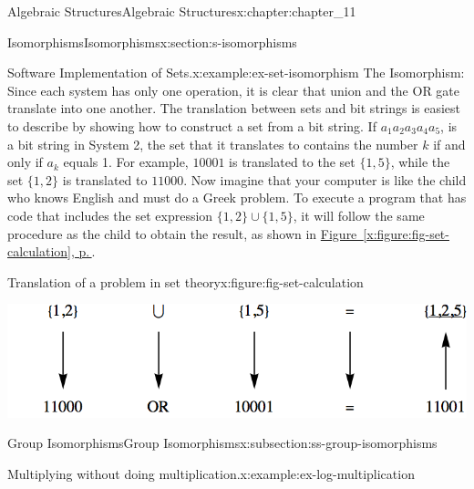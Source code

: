 \documentclass[twoside,10pt,]{book}
\newcommand{\xreffont}{\relax}
\numberwithin{equation}{section}
\begin{document}
\begin{chapterptx}{Algebraic Structures}{}{Algebraic Structures}{}{}{x:chapter:chapter_11}
\begin{sectionptx}{Isomorphisms}{}{Isomorphisms}{}{}{x:section:s-isomorphisms}
\begin{introduction}{}
\begin{example}{Software Implementation of Sets.}{x:example:ex-set-isomorphism}
The Isomorphism: Since each system has only one operation, it is clear that union and the OR gate translate into one another. The translation between sets and bit strings is easiest to describe by showing how to construct a set from a bit string. If \(a_1a_2a_3a_4a_5\), is a bit string in System 2, the set that it translates to contains the number \(k\) if and only if \(a_k\) equals 1. For example, \(10001\) is translated to the set \(\{1, 5\}\), while the set \(\{1, 2\}\) is translated to \(11000.\) Now imagine that your computer is like the child who knows English and must do a Greek problem. To execute a program that has code that includes the set expression \(\{1, 2\} \cup  \{1, 5\}\), it will follow the same procedure as the child to obtain the result, as shown in \hyperref[x:figure:fig-set-calculation]{Figure~{\xreffont\ref{x:figure:fig-set-calculation}}, p.\,\pageref{x:figure:fig-set-calculation}}.%
\begin{figureptx}{Translation of a problem in set theory}{x:figure:fig-set-calculation}{}%
\begin{image}{0.15}{0.7}{0.15}%
\includegraphics[width=\linewidth]{images/fig-set-calculation.png}
\end{image}%
\tcblower
\end{figureptx}%
\end{example}
\end{introduction}%
%
%
\typeout{************************************************}
\typeout{************************************************}
%
\begin{subsectionptx}{Group Isomorphisms}{}{Group Isomorphisms}{}{}{x:subsection:ss-group-isomorphisms}
\begin{example}{Multiplying without doing multiplication.}{x:example:ex-log-multiplication}%

\end{example}
\end{subsectionptx}
\end{sectionptx}
\end{chapterptx}
\end{document}
